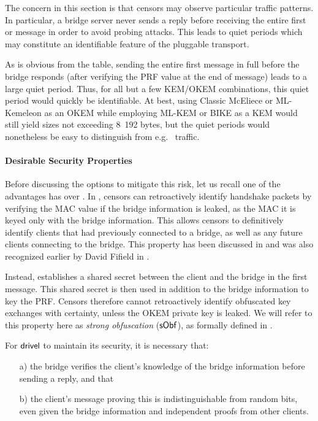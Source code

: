 The concern in this section is that censors may observe particular traffic patterns. In particular, a bridge server never sends a reply before receiving the entire first \drivel{} or \obfsfour{} message in order to avoid probing attacks. This leads to quiet periods which may constitute an identifiable feature of the pluggable transport.

As is obvious from the table, sending the entire first \drivel{} message in full before the bridge responds (after verifying the PRF value at the end of message) leads to a large quiet period. Thus, for all but a few KEM/OKEM combinations, this quiet period would quickly be identifiable. At best, using Classic McEliece or ML-Kemeleon as an OKEM while employing ML-KEM or BIKE as a KEM would still yield sizes not exceeding 8~192 bytes, but the quiet periods would nonetheless be easy to distinguish from e.g.~\obfsfour{} traffic.

\paragraph{Desirable Security Properties}
Before discussing the options to mitigate this risk, let us recall one of the advantages \drivel{} has over \obfsfour{}. In \obfsfour{}, censors can retroactively identify handshake packets by verifying the MAC value if the bridge information is leaked, as the MAC it is keyed only with the bridge information. This allows censors to definitively identify clients that had previously connected to a bridge, as well as any future clients connecting to the bridge. This property has been discussed in \cite[Section~6]{CCS:GunSteVei24} and was also recognized earlier by David Fifield in \cite{obfs4-pk-reveal-distinguisher}.

Instead, \drivel{} establishes a shared secret between the client and the bridge in the first message. This shared secret is then used in addition to the bridge information to key the PRF. Censors therefore cannot retroactively identify obfuscated key exchanges with certainty, unless the OKEM private key is leaked. We will refer to this property here as \emph{strong obfuscation} ($\mathsf{sObf}$), as formally defined in \cite{CCS:GunSteVei24}.

For $\textsf{drivel}$ to maintain its security, it is necessary that:
\begin{itemize}
    \item[a)] the bridge verifies the client's knowledge of the bridge information before sending a reply, and that
    \item[b)] the client's message proving this is indistinguishable from random bits, even given the bridge information and independent proofs from other clients.
\end{itemize}

